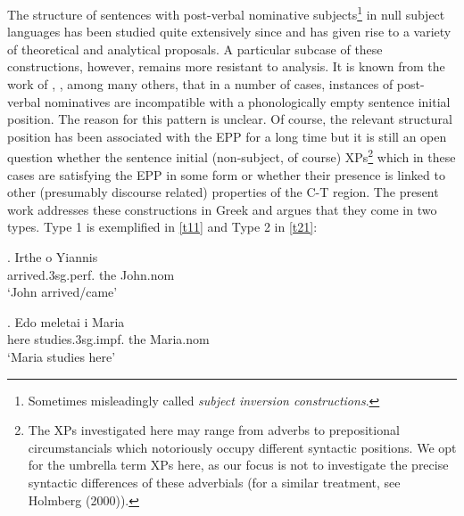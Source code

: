\documentclass[11pt]{article}
\begin{document}
The structure of sentences with post-verbal nominative subjects\footnote{Sometimes misleadingly called \textit{ subject inversion constructions}.} in null subject languages has been studied quite extensively since \citet{rizzi:82} and has given rise to a variety of theoretical and analytical proposals.  A particular subcase of these constructions, however, remains more resistant to analysis.  It is known from the work of \citet{zubizarreta:1998a}, \citet{pinto:97}, \citet{sheehan:06} among many others, that in a number of cases, instances of post-verbal nominatives are incompatible with a phonologically empty sentence initial position.  The reason for this pattern is unclear.  Of course, the relevant structural position has been associated with the EPP for a long time but it is still an open question whether the sentence initial (non-subject, of course) XPs\footnote{ The XPs investigated here may range from adverbs to prepositional circumstancials which notoriously occupy different syntactic positions. We opt for the umbrella term XPs here, as our focus is not to investigate the precise syntactic differences of these adverbials (for a similar treatment, see Holmberg (2000)).} which  in these cases are satisfying the EPP in some form or whether their presence is linked to other (presumably discourse related) properties of the C-T region.  The present work addresses these constructions in Greek and argues that they come in two types.  Type 1 is exemplified in \ref{t11} and Type 2 in \ref{t21}:

\exg. 
Irthe o Yiannis\\
arrived.3sg.perf. the John.nom\\ \label{t11}
`John arrived/came'

\exg. 
Edo meletai i Maria \\
here studies.3sg.impf. the Maria.nom \\ \label{t21}
`Maria studies here'
\end{document}

